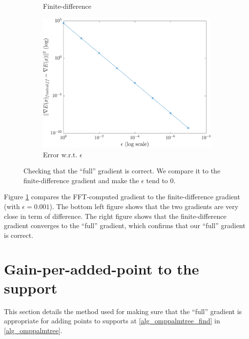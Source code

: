 \begin{figure}[!ht]
\begin{subfigure}[b]{0.30\textwidth}
\caption{Finite-difference}
\end{subfigure}
\begin{subfigure}[b]{0.35\textwidth}\centering
\includegraphics[width=\textwidth]{figures/verif_gradient/finite-diff-vs-grad.pdf}
\caption{Error w.r.t. $\epsilon$}
\end{subfigure}
\caption{Checking that the “full” gradient is correct. We compare it to the finite-difference gradient and make the $\epsilon$ tend to 0.} \label{fig_verif_gradient}
\end{figure}

Figure \ref{fig_verif_gradient} compares the FFT-computed gradient to the finite-difference gradient (with $\epsilon=0.001$). The bottom left figure shows that the two gradients are very close in term of difference. The right figure shows that the finite-difference gradient converges to the “full” gradient, which confirms that our “full” gradient is correct.

\section{Gain-per-added-point to the support}\label{sec_gain_per_added_point}

This section details the method used for making sure that the “full” gradient is appropriate for adding points to supports at \cref{alg_omppalmtree_find} in \cref{alg_omppalmtree}.

